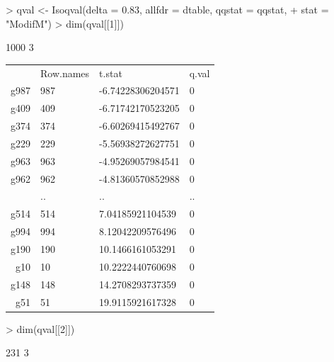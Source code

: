 \documentclass[10pt]{mybook4}
\begin{document}
\begin{Schunk}
\begin{Sinput}
> qval <- Isoqval(delta = 0.83, allfdr = dtable, qqstat = qqstat, 
+     stat = "ModifM")
> dim(qval[[1]])
\end{Sinput}
\begin{Soutput}
[1] 1000    3
\end{Soutput}
\end{Schunk}

\begin{table}[!h]
\begin{left}
\begin{tabular}{rlll}
  & Row.names & t.stat & q.val \\
 g987 & 987 & -6.74228306204571 & 0 \\
  g409 & 409 & -6.71742170523205 & 0 \\
  g374 & 374 & -6.60269415492767 & 0 \\
  g229 & 229 & -5.56938272627751 & 0 \\
  g963 & 963 & -4.95269057984541 & 0 \\
  g962 & 962 & -4.81360570852988 & 0 \\
   & .. & .. & .. \\
  g514 & 514 & 7.04185921104539 & 0 \\
  g994 & 994 & 8.12042209576496 & 0 \\
  g190 & 190 & 10.1466161053291 & 0 \\
  g10 & 10 & 10.2222440760698 & 0 \\
  g148 & 148 & 14.2708293737359 & 0 \\
  g51 & 51 & 19.9115921617328 & 0 \\
  \end{tabular}
\end{left}
\end{table}
\begin{Schunk}
\begin{Sinput}
> dim(qval[[2]])
\end{Sinput}
\begin{Soutput}
[1] 231   3
\end{Soutput}
\end{Schunk}
\end{document}
